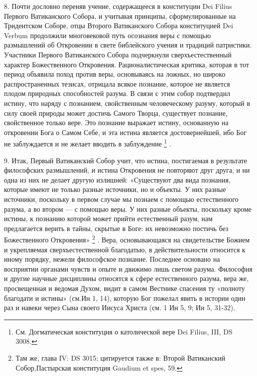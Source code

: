 \documentclass[a5paper,10pt]{article}
\begin{document}
8. Почти дословно переняв учение, содержащееся в конституции Dei Filius Первого
Ватиканского Собора, и учитывая принципы, сформулированные на Тридентском
Соборе, отцы Второго Ватиканского Собора конституцией Dei Verbum продолжили
многовековой путь осознания веры с помощью размышлений об Откровении в свете
библейского учения и традиций патристики. Участники Первого Ватиканского Собора
подчеркнули сверхъестественный характер Божественного Откровения.
Рационалистическая критика, которая в тот период объявила поход против веры,
основываясь на ложных, но широко распространенных тезисах, отрицала всякое
познание, которое не является плодом природных способностей разума. В связи с
этим собор подтвердил истину, что наряду с познанием, свойственным
человеческому разуму, который в силу своей природы может достичь Самого Творца,
существует познание, свойственное только вере. Это познание выражает истину,
основанную на откровении Бога о Самом Себе, и эта истина является
достовернейшей, ибо Бог не заблуждается и не желает вводить в заблуждение
\footnote{См. Догматическая конституция о католической вере Dei Filius, III, DS
3008.} .

9. Итак, Первый Ватиканский Собор учит, что истина, постигаемая в результате
философских размышлений, и истина Откровения не повторяют друг друга, и ни одна
из них не делает другую излишней: «Существуют два вида познания, которые имеют
не только разные источники, но и объекты. У них разные источники, поскольку в
первом случае мы познаем с помощью естественного разума, а во втором — с
помощью веры. У них разные объекты, поскольку кроме истины, к познанию которой
может прийти естественный разум, нам предлагается верить в тайны, скрытые в
Боге: их невозможно постичь без Божественного Откровения» \footnote{Там же,
глава IV: DS 3015; цитируется также в: Второй Ватиканский Собор,Пастырская
конституция Gaudium et spes, 59.} . Вера, основывающаяся на свидетельстве
Божием и укрепляемая сверхъестественной благодатью, в действительности
относится к иному порядку, нежели философское познание. Последнее основано на
восприятии органами чувств и опыте и движимо лишь светом разума. Философия и
другие научные дисциплины относятся к сфере естественного разума, вера же,
просвещенная и ведомая Духом, видит в самом Вестнике спасения ту «полноту
благодати и истины» (см.Ин 1, 14), которую Бог пожелал явить в истории один раз
и навеки через Сына своего Иисуса Христа (см.  1 Ин 5, 9; Ин 5, 31-32).
\end{document}

